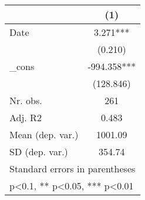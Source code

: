 {
\def\sym#1{\ifmmode^{#1}\else\(^{#1}\)\fi}
\begin{tabular}{l*{1}{c}}
\hline\hline
            &\multicolumn{1}{c}{(1)}   \\
\hline
Date        &       3.271***\\
            &     (0.210)   \\
[1em]
\_cons      &    -994.358***\\
            &   (128.846)   \\
\hline
Nr. obs.    &         261   \\
Adj. R2     &       0.483   \\
Mean (dep. var.)&     1001.09   \\
SD (dep. var.)&      354.74   \\
\hline\hline
\multicolumn{2}{l}{\footnotesize Standard errors in parentheses}\\
\multicolumn{2}{l}{\footnotesize * p<0.1, ** p<0.05, *** p<0.01}\\
\end{tabular}
}
